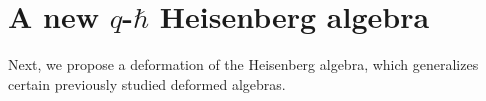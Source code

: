 \documentclass[12pt,a4paper]{article}
\theoremstyle{plain}
\theoremstyle{definition}
\theoremstyle{remark}
\begin{document}




\section{A new \texorpdfstring{$q$-$\hbar$}{Lg} Heisenberg algebra}\label{propose-Heis}
Next, we propose a deformation of the Heisenberg algebra, which generalizes certain previously studied deformed algebras.
\end{document}
